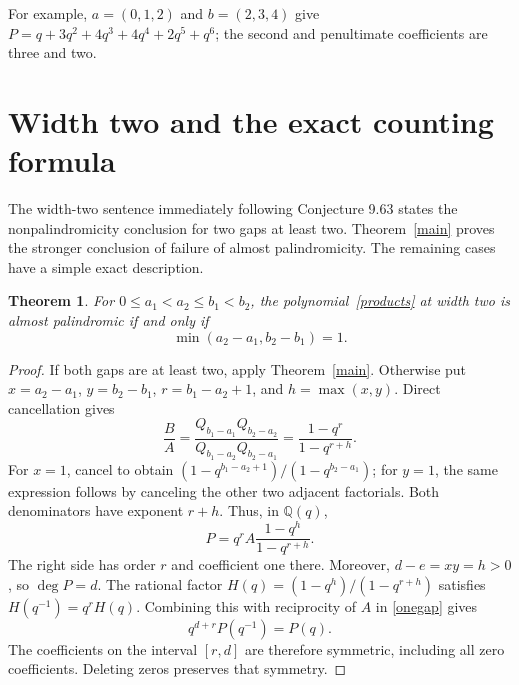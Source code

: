 \documentclass[11pt,a4paper]{article}
\newtheorem{theorem}{Theorem}
\begin{document}
For example, $a=(0,1,2)$ and $b=(2,3,4)$ give
$P=q+3q^2+4q^3+4q^4+2q^5+q^6$; the second and penultimate coefficients
are three and two.

\section{Width two and the exact counting formula}

The width-two sentence immediately following Conjecture 9.63 states the
nonpalindromicity conclusion for two gaps at least two.
Theorem~\ref{main} proves the stronger conclusion of failure of almost
palindromicity. The remaining cases have a simple exact description.

\begin{theorem}\label{classification}
For $0\le a_1<a_2\le b_1<b_2$, the polynomial~\eqref{products} at width
two is almost palindromic if and only if
\[
 \min(a_2-a_1,b_2-b_1)=1.
\]
\end{theorem}
\begin{proof}
If both gaps are at least two, apply Theorem~\ref{main}.
Otherwise put $x=a_2-a_1$, $y=b_2-b_1$, $r=b_1-a_2+1$, and
$h=\max(x,y)$. Direct cancellation gives
\[
 \frac BA=
 \frac{Q_{b_1-a_1}Q_{b_2-a_2}}{Q_{b_1-a_2}Q_{b_2-a_1}}
 =\frac{1-q^r}{1-q^{r+h}}.
\]
For $x=1$, cancel to obtain
$(1-q^{b_1-a_2+1})/(1-q^{b_2-a_1})$; for $y=1$, the same
expression follows by canceling the other two adjacent factorials.
Both denominators have exponent $r+h$. Thus, in $\mathbb Q(q)$,
\begin{equation}\label{onegap}
 P=q^r A\frac{1-q^h}{1-q^{r+h}}.
\end{equation}
The right side has order $r$ and coefficient one there. Moreover,
$d-e=xy=h>0$, so $\deg P=d$.
The rational factor $H(q)=(1-q^h)/(1-q^{r+h})$ satisfies
$H(q^{-1})=q^rH(q)$. Combining this with reciprocity of $A$ in
\eqref{onegap} gives
\[
 q^{d+r}P(q^{-1})=P(q).
\]
The coefficients on the interval $[r,d]$ are therefore symmetric,
including all zero coefficients. Deleting zeros preserves that symmetry.
\end{proof}
\end{document}

